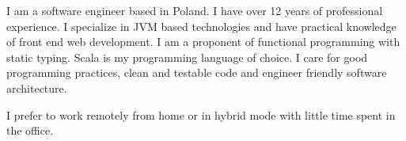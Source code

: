 \documentclass[9pt]{developercv} %
\begin{document}
\vspace{0.5cm}



\begin{minipage}[t]{0.45\textwidth} %
	\vspace{-\baselineskip} %
	
	I am a software engineer based in Poland. I have over 12 years of professional experience. I specialize in JVM based technologies and have practical knowledge of front end web development. I am a proponent of functional programming with static typing. Scala is my programming language of choice. I care for good programming practices, clean and testable code and engineer friendly software architecture.

    I prefer to work remotely from home or in hybrid mode with little time spent in the office.
\end{minipage}
\hfill %
\begin{minipage}[t]{0.5\textwidth} %
	\vspace{-\baselineskip} %
	\begin{barchart}{5.5}
	\end{barchart}
\end{minipage}

\begin{center}
\end{center}


\end{document}
